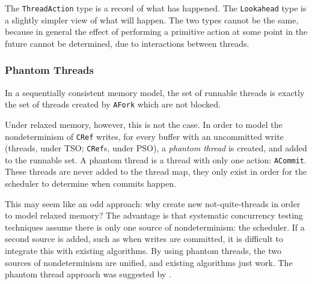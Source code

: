 The \verb|ThreadAction| type is a record of what has happened. The
\verb|Lookahead| type is a slightly simpler view of what will
happen. The two types cannot be the same, because in general the
effect of performing a primitive action at some point in the future
cannot be determined, due to interactions between threads.

\subsubsection{Phantom Threads}
\label{sec:execution-scheduling-phantom}

In a sequentially consistent memory model, the set of runnable threads
is exactly the set of threads created by \verb|AFork| which are not
blocked.

Under relaxed memory, however, this is not the case. In order to model
the nondeterminism of \verb|CRef| writes, for every buffer with an
uncommitted write (threads, under TSO; \verb|CRef|s, under PSO), a
\emph{phantom thread} is created, and added to the runnable set. A
phantom thread is a thread with only one action: \verb|ACommit|. These
threads are never added to the thread map, they only exist in order
for the scheduler to determine when commits happen.

This may seem like an odd approach: why create new not-quite-threads
in order to model relaxed memory? The advantage is that systematic
concurrency testing techniques assume there is only one source of
nondeterminism: the scheduler. If a second source is added, such as
when writes are committed, it is difficult to integrate this with
existing algorithms. By using phantom threads, the two sources of
nondeterminism are unified, and existing algorithms just work. The
phantom thread approach was suggested by \citep{rdpor}.
